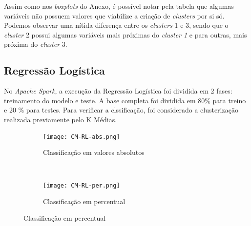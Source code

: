 Assim como nos \emph{boxplots} do Anexo, é possível notar pela tabela que algumas variáveis não possuem valores que viabilize a criação de \emph{clusters} por si só.
Podemos observar uma nítida diferença entre os \emph{clusters} 1 e 3, sendo que o \emph{cluster} 2 possui algumas variáveis mais próximas do \emph{cluster 1} e para outras, mais próxima do \emph{cluster} 3.


\subsection{Regressão Logística}


No \emph{Apache Spark}, a execução da Regressão Logística foi dividida em 2 fases: treinamento do modelo e teste. A base completa foi dividida em 80\% para treino e 20 \% para testes. Para verificar a clssificação, foi considerado a clusterização realizada previamente pelo K Médias. 





\begin{figure}[!ht]
    \centering
        \caption{Resultados da clusterização da Regressão Logística}
    \begin{subfigure}[t]{0.45\textwidth}
        \centering
\texttt{[image: CM-RL-abs.png]}

        \caption{Classificação em valores absolutos}
    \end{subfigure}%
    ~ 
    \begin{subfigure}[t]{0.45\textwidth}
        \centering
        \texttt{[image: CM-RL-per.png]}
        \caption{Classificação em percentual}
    \end{subfigure}

\end{figure}

